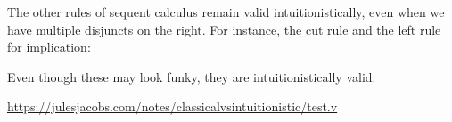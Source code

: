 \documentclass[a4paper, 11pt]{article}
\theoremstyle{definition}
\begin{document}
The other rules of sequent calculus remain valid intuitionistically, even when we have multiple disjuncts on the right. For instance, the cut rule and the left rule for implication:
\begin{mathpar}

\end{mathpar}
Even though these may look funky, they are intuitionistically valid:

\begin{center}
  \url{https://julesjacobs.com/notes/classicalvsintuitionistic/test.v}
\end{center}
\end{document}
